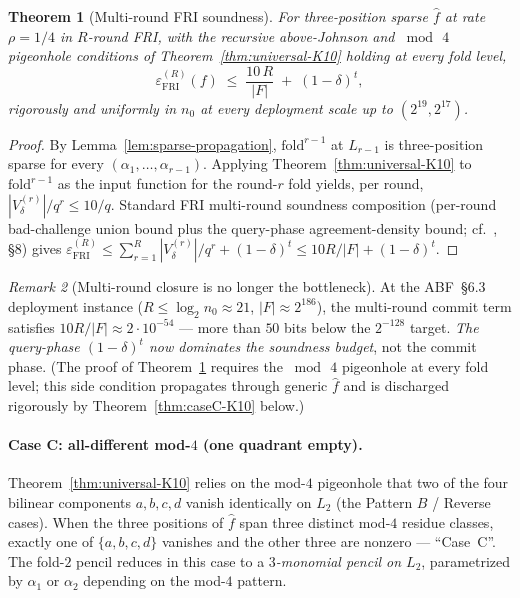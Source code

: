 \documentclass[11pt]{article}
\newtheorem{theorem}{Theorem}[section]
\theoremstyle{definition}
\theoremstyle{remark}
\newtheorem{remark}[theorem]{Remark}
\begin{document}
\begin{theorem}[Multi-round FRI soundness]
\label{thm:R-fold-K10}
For three-position sparse $\hat f$ at rate $\rho = 1/4$ in $R$-round
FRI, with the recursive above-Johnson and $\bmod\,4$ pigeonhole
conditions of Theorem~\ref{thm:universal-K10} holding at every fold
level,
\[
 \varepsilon_{\mathrm{FRI}}^{(R)}(f) \;\leq\;
 \frac{10\,R}{|F|} \;+\; (1-\delta)^t,
\]
rigorously and uniformly in $n_0$ at every deployment scale up to
$(2^{19}, 2^{17})$.
\end{theorem}

\begin{proof}
By Lemma~\ref{lem:sparse-propagation}, $\mathrm{fold}^{r-1}$ at $L_{r-1}$
is three-position sparse for every $(\alpha_1, \dots, \alpha_{r-1})$.
Applying Theorem~\ref{thm:universal-K10} to $\mathrm{fold}^{r-1}$ as the
input function for the round-$r$ fold yields, per round,
$|V_\delta^{(r)}|/q^r \leq 10/q$. Standard FRI multi-round soundness
composition (per-round bad-challenge union bound plus the query-phase
agreement-density bound; cf.~\cite{BCIKS}, \S 8) gives
$\varepsilon_{\mathrm{FRI}}^{(R)} \leq \sum_{r=1}^{R} |V_\delta^{(r)}|/q^r +
(1-\delta)^t \leq 10R/|F| + (1-\delta)^t$.
\end{proof}

\begin{remark}[Multi-round closure is no longer the bottleneck]
\label{rem:R-fold-abf}
At the ABF~\S 6.3 deployment instance ($R \leq \log_2 n_0 \approx 21$,
$|F| \approx 2^{186}$), the multi-round commit term satisfies
$10R/|F| \approx 2 \cdot 10^{-54}$ --- more than $50$ bits below the
$2^{-128}$ target. \emph{The query-phase $(1-\delta)^t$ now dominates
the soundness budget}, not the commit phase. (The proof of
Theorem~\ref{thm:R-fold-K10} requires the $\bmod\,4$ pigeonhole at
every fold level; this side condition propagates through generic
$\hat f$ and is discharged rigorously by
Theorem~\ref{thm:caseC-K10} below.)
\end{remark}

\paragraph{Case C: all-different mod-$4$ (one quadrant empty).}
Theorem~\ref{thm:universal-K10} relies on the mod-$4$ pigeonhole
that two of the four bilinear components $a, b, c, d$ vanish identically
on $L_2$ (the Pattern $B$ / Reverse cases). When the three positions
of $\hat f$ span three distinct mod-$4$ residue classes, exactly one of
$\{a, b, c, d\}$ vanishes and the other three are nonzero ---
``Case~C''. The fold-$2$ pencil reduces in this case to a
\emph{$3$-monomial pencil on $L_2$}, parametrized by $\alpha_1$ or
$\alpha_2$ depending on the mod-$4$ pattern.
\end{document}
